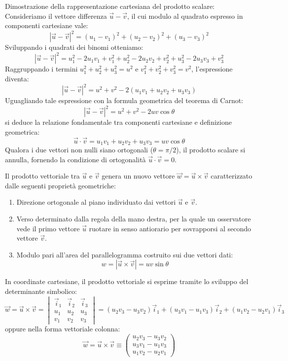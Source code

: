 \documentclass[12pt, a4paper]{article}
\begin{document}
	Dimostrazione della rappresentazione cartesiana del prodotto scalare:
	Consideriamo il vettore differenza $\vec{u} - \vec{v}$, il cui modulo al quadrato espresso in componenti cartesiane vale:
	\[
	|\vec{u} - \vec{v}|^2 = (u_1 - v_1)^2 + (u_2 - v_2)^2 + (u_3 - v_3)^2
	\]
	Sviluppando i quadrati dei binomi otteniamo:
	\[
	|\vec{u} - \vec{v}|^2 = u_1^2 - 2u_1 v_1 + v_1^2 + u_2^2 - 2u_2 v_2 + v_2^2 + u_3^2 - 2u_3 v_3 + v_3^2
	\]
	Raggruppando i termini $u_1^2 + u_2^2 + u_3^2 = u^2$ e $v_1^2 + v_2^2 + v_3^2 = v^2$, l'espressione diventa:
	\[
	|\vec{u} - \vec{v}|^2 = u^2 + v^2 - 2(u_1 v_1 + u_2 v_2 + u_3 v_3)
	\]
	Uguagliando tale espressione con la formula geometrica del teorema di Carnot:
	\[
	|\vec{u} - \vec{v}|^2 = u^2 + v^2 - 2uv \cos\theta
	\]
	si deduce la relazione fondamentale tra componenti cartesiane e definizione geometrica:
	\[
	\vec{u} \cdot \vec{v} = u_1 v_1 + u_2 v_2 + u_3 v_3 = uv \cos\theta
	\]
	Qualora i due vettori non nulli siano ortogonali ($\theta = \pi/2$), il prodotto scalare si annulla, fornendo la condizione di ortogonalità $\vec{u} \cdot \vec{v} = 0$.
	
	Il prodotto vettoriale tra $\vec{u}$ e $\vec{v}$ genera un nuovo vettore $\vec{w} = \vec{u} \times \vec{v}$ caratterizzato dalle seguenti proprietà geometriche:
	\begin{enumerate}
		\item Direzione ortogonale al piano individuato dai vettori $\vec{u}$ e $\vec{v}$.
		\item Verso determinato dalla regola della mano destra, per la quale un osservatore vede il primo vettore $\vec{u}$ ruotare in senso antiorario per sovrapporsi al secondo vettore $\vec{v}$.
		\item Modulo pari all'area del parallelogramma costruito sui due vettori dati:
		\[
		w = |\vec{u} \times \vec{v}| = uv \sin\theta
		\]
	\end{enumerate}
	
	In coordinate cartesiane, il prodotto vettoriale si esprime tramite lo sviluppo del determinante simbolico:
	\[
	\vec{w} = \vec{u} \times \vec{v} = \begin{vmatrix} \vec{i}_1 & \vec{i}_2 & \vec{i}_3 \\ u_1 & u_2 & u_3 \\ v_1 & v_2 & v_3 \end{vmatrix} = (u_2 v_3 - u_3 v_2)\vec{i}_1 + (u_3 v_1 - u_1 v_3)\vec{i}_2 + (u_1 v_2 - u_2 v_1)\vec{i}_3
	\]
	oppure nella forma vettoriale colonna:
	\[
	\vec{w} = \vec{u} \times \vec{v} \equiv \begin{pmatrix} u_2 v_3 - u_3 v_2 \\ u_3 v_1 - u_1 v_3 \\ u_1 v_2 - u_2 v_1 \end{pmatrix}
	\]
	
\end{document}
